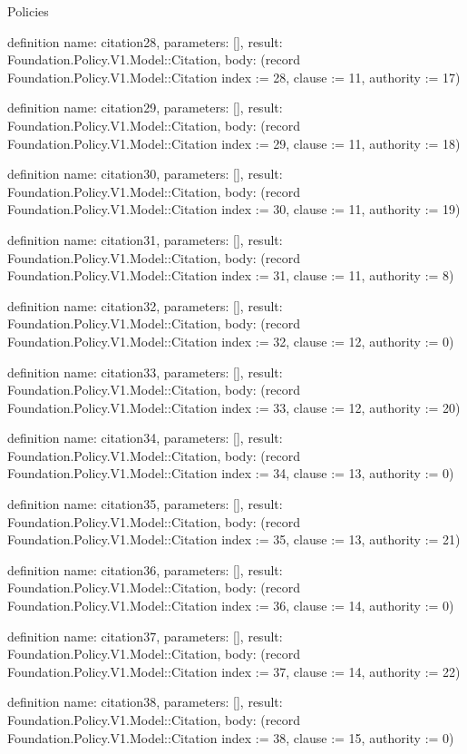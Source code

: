 \begin{lexlean}{Policies}
\begin{semanticmodule}
definition{
  name: citation28,
  parameters: [],
  result: Foundation.Policy.V1.Model::Citation,
  body: (record Foundation.Policy.V1.Model::Citation {index := 28, clause := 11, authority := 17})
}

definition{
  name: citation29,
  parameters: [],
  result: Foundation.Policy.V1.Model::Citation,
  body: (record Foundation.Policy.V1.Model::Citation {index := 29, clause := 11, authority := 18})
}

definition{
  name: citation30,
  parameters: [],
  result: Foundation.Policy.V1.Model::Citation,
  body: (record Foundation.Policy.V1.Model::Citation {index := 30, clause := 11, authority := 19})
}

definition{
  name: citation31,
  parameters: [],
  result: Foundation.Policy.V1.Model::Citation,
  body: (record Foundation.Policy.V1.Model::Citation {index := 31, clause := 11, authority := 8})
}

definition{
  name: citation32,
  parameters: [],
  result: Foundation.Policy.V1.Model::Citation,
  body: (record Foundation.Policy.V1.Model::Citation {index := 32, clause := 12, authority := 0})
}

definition{
  name: citation33,
  parameters: [],
  result: Foundation.Policy.V1.Model::Citation,
  body: (record Foundation.Policy.V1.Model::Citation {index := 33, clause := 12, authority := 20})
}

definition{
  name: citation34,
  parameters: [],
  result: Foundation.Policy.V1.Model::Citation,
  body: (record Foundation.Policy.V1.Model::Citation {index := 34, clause := 13, authority := 0})
}

definition{
  name: citation35,
  parameters: [],
  result: Foundation.Policy.V1.Model::Citation,
  body: (record Foundation.Policy.V1.Model::Citation {index := 35, clause := 13, authority := 21})
}

definition{
  name: citation36,
  parameters: [],
  result: Foundation.Policy.V1.Model::Citation,
  body: (record Foundation.Policy.V1.Model::Citation {index := 36, clause := 14, authority := 0})
}

definition{
  name: citation37,
  parameters: [],
  result: Foundation.Policy.V1.Model::Citation,
  body: (record Foundation.Policy.V1.Model::Citation {index := 37, clause := 14, authority := 22})
}

definition{
  name: citation38,
  parameters: [],
  result: Foundation.Policy.V1.Model::Citation,
  body: (record Foundation.Policy.V1.Model::Citation {index := 38, clause := 15, authority := 0})
}


\end{semanticmodule}
\end{lexlean}

